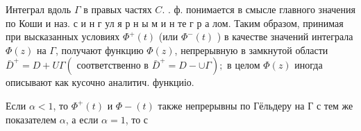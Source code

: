 \documentclass[10pt]{article}
\begin{document}
Интеграл вдоль $\Gamma$ в правых частях $C$. . ф. понимается в смысле главного значения по Коши и наз. с и н г ул я р н ы м и н те г р а лом. Таким образом, принимая при высказанных условиях $\Phi^{+}(t)$ (или $\Phi^{-}(t)$ ) в качестве значений интеграла $\Phi(z)$ на $\Gamma$, получают функцию $\Phi(z)$, непрерывную в замкнутой области $\bar{D}^{+}=D+U \Gamma\left(\right.$ соответственно в $\left.\bar{D}^{+}=D-\cup \Gamma\right) ;$ в целом $\Phi(z)$ иногда описывают как кусочно аналитич. функциіо.



Если $\alpha<1$, то $\Phi^{+}(t)$ и $\Phi-(t)$ также непрерывны по Гёльдеру на Г с тем же показателем $\alpha$, а если $\alpha=1$, то с
\end{document}
